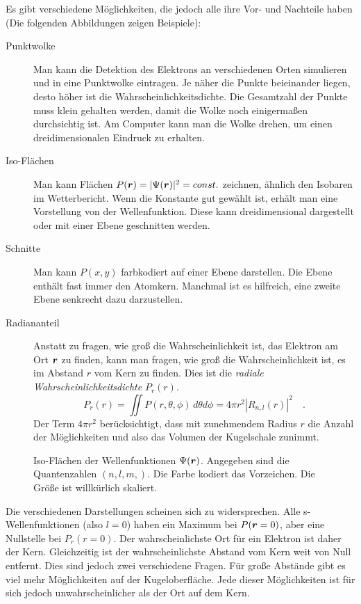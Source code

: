 Es gibt verschiedene Möglichkeiten, die jedoch alle ihre Vor- und Nachteile haben (Die folgenden Abbildungen zeigen Beispiele):
\begin{description}
    \item[Punktwolke] Man kann die Detektion des Elektrons an verschiedenen Orten simulieren und in eine Punktwolke eintragen. Je näher die Punkte beieinander liegen, desto höher ist die Wahrscheinlichkeitsdichte. Die Gesamtzahl der Punkte muss klein gehalten werden, damit die Wolke noch einigermaßen durchsichtig ist. Am Computer kann man die Wolke drehen, um einen dreidimensionalen Eindruck zu erhalten.
    \item[Iso-Flächen] Man kann Flächen $P(\boldsymbol{r}) = |\Psi(\boldsymbol{r})|^2 = const.$ zeichnen, ähnlich den Isobaren im Wetterbericht. Wenn die Konstante gut gewählt ist, erhält man eine Vorstellung von der Wellenfunktion. Diese kann dreidimensional dargestellt oder mit einer Ebene geschnitten werden.
    \item[Schnitte] Man kann $P(x,y)$ farbkodiert auf einer Ebene darstellen. Die Ebene enthält fast immer den Atomkern. Manchmal ist es hilfreich, eine zweite Ebene senkrecht dazu darzustellen.
    \item[Radiananteil] Anstatt zu fragen, wie groß die Wahrscheinlichkeit ist, das Elektron am Ort $\boldsymbol{r}$ zu finden, kann man fragen, wie groß die Wahrscheinlichkeit ist, es im Abstand $r$ vom Kern zu finden. Dies ist die \emph{radiale Wahrscheinlichkeitsdichte} $P_r(r)$.
    \begin{equation}
        P_r(r) = \iint P(r, \theta, \phi) \, d\theta d\phi = 4 \pi r^2 |R_{n,l}(r)|^2 \quad .
    \end{equation}
    Der Term $4 \pi r^2$ berücksichtigt, dass mit zunehmendem Radius $r$ die Anzahl der Möglichkeiten und also das Volumen der Kugelschale zunimmt.
\end{description}

\begin{figure}[tb]
    \caption{Iso-Flächen der Wellenfunktionen $\Psi(\boldsymbol{r})$. Angegeben sind die Quantenzahlen $(n,l,m,)$. Die Farbe kodiert das Vorzeichen. Die Größe ist willkürlich skaliert.}
\end{figure}

Die verschiedenen Darstellungen scheinen sich zu widersprechen. Alle s-Wellenfunktionen (also $l=0$) haben ein Maximum bei $P(\boldsymbol{r} = 0)$, aber eine Nullstelle bei $P_r(r=0)$. Der wahrscheinlichste Ort für ein Elektron ist daher der Kern. Gleichzeitig ist der wahrscheinlichste Abstand vom Kern weit von Null entfernt.  Dies sind jedoch zwei verschiedene Fragen.  Für große Abstände gibt es viel mehr Möglichkeiten auf der Kugeloberfläche. Jede dieser Möglichkeiten ist für sich jedoch unwahrscheinlicher als der Ort auf dem Kern.


